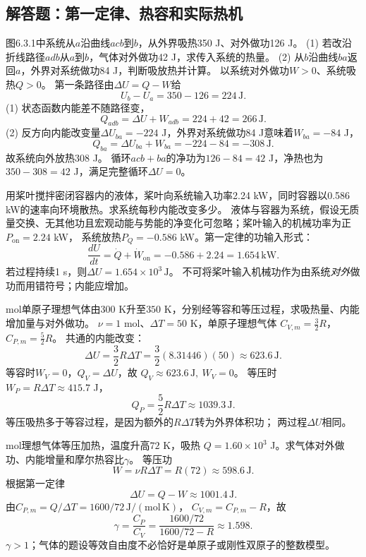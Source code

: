 \subsection{解答题：第一定律、热容和实际热机}

\problemtext 图6.3.1中系统从$a$沿曲线$acb$到$b$，从外界吸热350 J、对外做功126 J。
(1) 若改沿折线路径$adb$从$a$到$b$，气体对外做功42 J，求传入系统的热量。
(2) 从$b$沿曲线$ba$返回$a$，外界对系统做功84 J，判断吸放热并计算。
\workings
以系统对外做功$W>0$、系统吸热$Q>0$。
第一条路径由$\Delta U=Q-W$给
\[
U_b-U_a=350-126=\boxed{224\,\mathrm J}.
\]
(1) 状态函数内能差不随路径变，
\[
\boxed{Q_{adb}=\Delta U+W_{adb}=224+42=266\,\mathrm J}.
\]
(2) 反方向内能改变量$\Delta U_{ba}=-224$ J，外界对系统做功84 J意味着$W_{ba}=-84$ J，
\[
\boxed{Q_{ba}=\Delta U_{ba}+W_{ba}
=-224-84=-308\,\mathrm J}.
\]
故系统向外放热308 J。
\crosscheck 循环$acb+ba$的净功为$126-84=42$ J，净热也为$350-308=42$ J，满足完整循环$\Delta U=0$。

\problemtext 用桨叶搅拌密闭容器内的液体，桨叶向系统输入功率2.24 kW，同时容器以0.586 kW的速率向环境散热。求系统每秒内能改变多少。
\workings
液体与容器为系统，假设无质量交换、无其他功且宏观动能与势能的净变化可忽略；桨叶输入的机械功率为正$P_{\mathrm{on}}=2.24$ kW，
系统放热$P_Q=-0.586$ kW。第一定律的功输入形式：
\[
\frac{dU}{dt}=\dot Q+\dot W_{\mathrm{on}}
=-0.586+2.24
=\boxed{1.654\,\mathrm{kW}}.
\]
若过程持续1 s，则$\boxed{\Delta U=1.654\times10^3\,\mathrm J}$。
\crosscheck 不可将桨叶输入机械功作为由系统\emph{对外}做功而用错符号；内能应增加。

 mol单原子理想气体由$300$ K升至$350$ K，分别经等容和等压过程，求吸热量、内能增加量与对外做功。
\workings
$\nu=1$ mol、$\Delta T=50$ K，单原子理想气体
$C_{V,m}=\frac32R$，$C_{P,m}=\frac52R$。
共通的内能改变：
\[
\boxed{\Delta U=\frac32R\Delta T
=\frac32(8.31446)(50)\approx623.6\,\mathrm J}.
\]
等容时$W_V=0$，$Q_V=\Delta U$，故
$\boxed{Q_V\approx623.6\,\mathrm J,\ W_V=0}$。
等压时$W_P=R\Delta T\approx415.7$ J，
\[
\boxed{Q_P=\frac52R\Delta T\approx1039.3\,\mathrm J}.
\]
\crosscheck 等压吸热多于等容过程，是因为额外的$R\Delta T$转为外界体积功；
两过程$\Delta U$相同。

 mol理想气体等压加热，温度升高$72$ K，吸热
$Q=1.60\times10^3$ J。求气体对外做功、内能增量和摩尔热容比$\gamma$。
\workings
等压功
\[
\boxed{W=\nu R\Delta T=R(72)\approx598.6\,\mathrm J}.
\]
根据第一定律
\[
\boxed{\Delta U=Q-W\approx1001.4\,\mathrm J}.
\]
由$C_{P,m}=Q/\Delta T=1600/72\,\mathrm{J/(mol\,K)}$，
$C_{V,m}=C_{P,m}-R$，故
\[
\boxed{\gamma=\frac{C_P}{C_V}
=\frac{1600/72}{1600/72-R}
\approx1.598}.
\]
\crosscheck $\gamma>1$；气体的题设等效自由度不必恰好是单原子或刚性双原子的整数模型。

